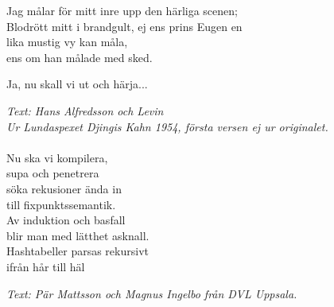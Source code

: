 Jag målar för mitt inre upp den härliga scenen;\\
Blodrött mitt i brandgult, ej ens prins Eugen en\\
lika mustig vy kan måla, \\
ens om han målade med sked.\par
\vspace{10pt}
Ja, nu skall vi ut och härja...\par
\vspace{10pt}
{\footnotesize\textit{Text: Hans Alfredsson och Levin\\ Ur Lundaspexet
    Djingis Kahn 1954, första versen ej ur originalet.}}\\
\\
Nu ska vi kompilera,\\
supa och penetrera\\
söka rekusioner ända in\\
till fixpunktssemantik.\\
Av induktion och basfall\\
blir man med lätthet asknall.\\
Hashtabeller parsas rekursivt\\
ifrån hår till häl\par
\vspace{10pt}
{\footnotesize\textit{Text: Pär Mattsson och Magnus Ingelbo från DVL
    Uppsala.}}
